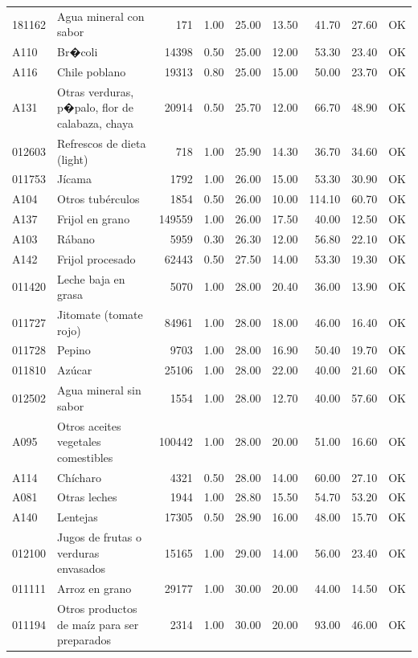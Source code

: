 \begin{table}[ht]
\begin{tabular}{llrrrrrrl}
  181162 & Agua mineral con sabor & 171 & 1.00 & 25.00 & 13.50 & 41.70 & 27.60 & OK \\ 
  A110 & Br�coli & 14398 & 0.50 & 25.00 & 12.00 & 53.30 & 23.40 & OK \\ 
  A116 & Chile poblano & 19313 & 0.80 & 25.00 & 15.00 & 50.00 & 23.70 & OK \\ 
  A131 & Otras verduras, p�palo, flor de calabaza, chaya & 20914 & 0.50 & 25.70 & 12.00 & 66.70 & 48.90 & OK \\ 
  012603 & Refrescos de dieta (light) & 718 & 1.00 & 25.90 & 14.30 & 36.70 & 34.60 & OK \\ 
  011753 & Jícama & 1792 & 1.00 & 26.00 & 15.00 & 53.30 & 30.90 & OK \\ 
  A104 & Otros tubérculos & 1854 & 0.50 & 26.00 & 10.00 & 114.10 & 60.70 & OK \\ 
  A137 & Frijol en grano & 149559 & 1.00 & 26.00 & 17.50 & 40.00 & 12.50 & OK \\ 
  A103 & Rábano & 5959 & 0.30 & 26.30 & 12.00 & 56.80 & 22.10 & OK \\ 
  A142 & Frijol procesado & 62443 & 0.50 & 27.50 & 14.00 & 53.30 & 19.30 & OK \\ 
  011420 & Leche baja en grasa & 5070 & 1.00 & 28.00 & 20.40 & 36.00 & 13.90 & OK \\ 
  011727 & Jitomate (tomate rojo) & 84961 & 1.00 & 28.00 & 18.00 & 46.00 & 16.40 & OK \\ 
  011728 & Pepino & 9703 & 1.00 & 28.00 & 16.90 & 50.40 & 19.70 & OK \\ 
  011810 & Azúcar & 25106 & 1.00 & 28.00 & 22.00 & 40.00 & 21.60 & OK \\ 
  012502 & Agua mineral sin sabor & 1554 & 1.00 & 28.00 & 12.70 & 40.00 & 57.60 & OK \\ 
  A095 & Otros aceites vegetales comestibles & 100442 & 1.00 & 28.00 & 20.00 & 51.00 & 16.60 & OK \\ 
  A114 & Chícharo & 4321 & 0.50 & 28.00 & 14.00 & 60.00 & 27.10 & OK \\ 
  A081 & Otras leches & 1944 & 1.00 & 28.80 & 15.50 & 54.70 & 53.20 & OK \\ 
  A140 & Lentejas & 17305 & 0.50 & 28.90 & 16.00 & 48.00 & 15.70 & OK \\ 
  012100 & Jugos de frutas o verduras envasados & 15165 & 1.00 & 29.00 & 14.00 & 56.00 & 23.40 & OK \\ 
  011111 & Arroz en grano & 29177 & 1.00 & 30.00 & 20.00 & 44.00 & 14.50 & OK \\ 
  011194 & Otros productos de maíz para ser preparados & 2314 & 1.00 & 30.00 & 20.00 & 93.00 & 46.00 & OK \\ 

\end{tabular}
\end{table}
